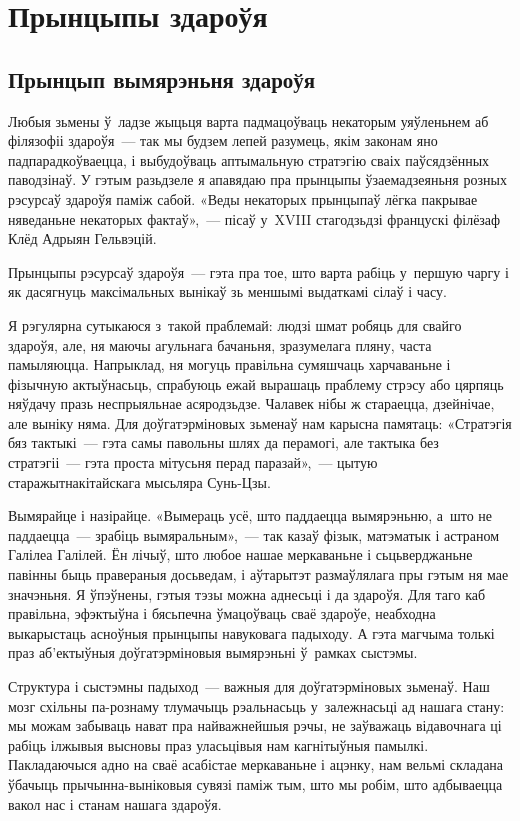 \chapter{Прынцыпы здароўя}

\section{Прынцып вымярэньня здароўя}

Любыя зьмены ў~ладзе жыцьця варта падмацоўваць некаторым уяўленьнем аб філязофіі здароўя~--- так мы будзем лепей разумець, якім законам яно падпарадкоўваецца, і выбудоўваць аптымальную стратэгію сваіх паўсядзённых паводзінаў. У гэтым разьдзеле я апавядаю пра прынцыпы ўзаемадзеяньня розных рэсурсаў здароўя паміж сабой. «Веды некаторых прынцыпаў лёгка пакрывае няведаньне некаторых фактаў»,~--- пісаў у~XVIII стагодзьдзі францускі філёзаф Клёд Адрыян Гельвэцій.

Прынцыпы рэсурсаў здароўя~--- гэта пра тое, што варта рабіць у~першую чаргу і як дасягнуць максімальных вынікаў зь меншымі выдаткамі сілаў і часу.

Я рэгулярна сутыкаюся з~такой праблемай: людзі шмат робяць для свайго здароўя, але, ня маючы агульнага бачаньня, зразумелага пляну, часта памыляюцца. Напрыклад, ня могуць правільна сумяшчаць харчаваньне і фізычную актыўнасьць, спрабуюць ежай вырашаць праблему стрэсу або цярпяць няўдачу празь неспрыяльнае асяродзьдзе. Чалавек нібы ж стараецца, дзейнічае, але выніку няма. Для доўгатэрміновых зьменаў нам карысна памятаць: «Стратэгія бяз тактыкі~--- гэта самы павольны шлях да перамогі, але тактыка без стратэгіі~--- гэта проста мітусьня перад паразай»,~--- цытую старажытнакітайскага мысьляра Сунь-Цзы.

Вымярайце і назірайце. «Вымераць усё, што паддаецца вымярэньню, а~што не паддаецца~--- зрабіць вымяральным»,~--- так казаў фізык, матэматык і астраном Галілеа Галілей. Ён лічыў, што любое нашае меркаваньне і сьцьверджаньне павінны быць правераныя досьведам, і аўтарытэт размаўлялага пры гэтым ня мае значэньня. Я ўпэўнены, гэтыя тэзы можна аднесьці і да здароўя. Для таго каб правільна, эфэктыўна і бясьпечна ўмацоўваць сваё здароўе, неабходна выкарыстаць асноўныя прынцыпы навуковага падыходу. А гэта магчыма толькі праз аб'ектыўныя доўгатэрміновыя вымярэньні ў~рамках сыстэмы.

Структура і сыстэмны падыход~--- важныя для доўгатэрміновых зьменаў. Наш мозг схільны па-рознаму тлумачыць рэальнасьць у~залежнасьці ад нашага стану: мы можам забываць нават пра найважнейшыя рэчы, не заўважаць відавочнага ці рабіць ілжывыя высновы праз уласьцівыя нам кагнітыўныя памылкі. Пакладаючыся адно на сваё асабістае меркаваньне і ацэнку, нам вельмі складана ўбачыць прычынна-выніковыя сувязі паміж тым, што мы робім, што адбываецца вакол нас і станам нашага здароўя.

